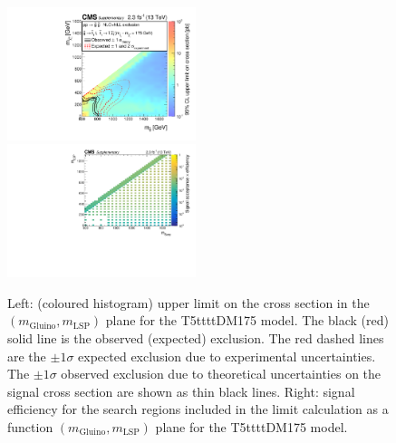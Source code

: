 \begin{figure}[t]
  \begin{center}
    \includegraphics[width=0.49\textwidth]{RA1T5ttttDM175XSEC_aux} \, 
    \includegraphics[width=0.49\textwidth]{T5ttttDM175_merging_4_cats_aux} \,     
  \end{center}
  \caption{Left: (coloured histogram) upper limit on the cross section in the $(m_{\mathrm{Gluino}},m_{\mathrm{LSP}})$ plane for the T5ttttDM175 model. 
  The black (red) solid line is the observed (expected) exclusion. The red dashed lines are the $\pm1\sigma$ expected exclusion due to experimental uncertainties. 
  The $\pm1\sigma$ observed exclusion due to theoretical uncertainties on the signal cross section are shown as thin black lines. 
  Right: signal efficiency for the search regions included in the limit calculation as a function $(m_{\mathrm{Gluino}},m_{\mathrm{LSP}})$ plane for the T5ttttDM175 model. 
  \label{fig:T5ttttDM175_excl}}
\end{figure}


